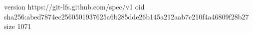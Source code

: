 version https://git-lfs.github.com/spec/v1
oid sha256:abed7874ec2560501937625a6b285dde26b145a212aab7c210f4a46809f28b27
size 1071
